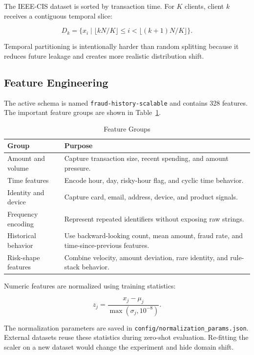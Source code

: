 \documentclass[conference]{IEEEtran}
\begin{document}
The IEEE-CIS dataset is sorted by transaction time. For \(K\) clients, client
\(k\) receives a contiguous temporal slice:

\begin{equation}
D_k=\{x_i \mid \lfloor kN/K \rfloor \leq i < \lfloor (k+1)N/K \rfloor\}.
\end{equation}

Temporal partitioning is intentionally harder than random splitting because it
reduces future leakage and creates more realistic distribution shift.

\subsection{Feature Engineering}

The active schema is named \texttt{fraud-history-scalable} and contains 328
features. The important feature groups are shown in Table~\ref{tab:features}.

\begin{table}[t]
\caption{Feature Groups}
\label{tab:features}
\centering
\begin{tabular}{p{}p{}}
\toprule
\textbf{Group} & \textbf{Purpose} \\
\midrule
Amount and volume & Capture transaction size, recent spending, and amount pressure. \\
Time features & Encode hour, day, risky-hour flag, and cyclic time behavior. \\
Identity and device & Capture card, email, address, device, and product signals. \\
Frequency encoding & Represent repeated identifiers without exposing raw strings. \\
Historical behavior & Use backward-looking count, mean amount, fraud rate, and time-since-previous features. \\
Risk-shape features & Combine velocity, amount deviation, rare identity, and rule-stack behavior. \\
\bottomrule
\end{tabular}
\end{table}

Numeric features are normalized using training statistics:

\begin{equation}
z_j=\frac{x_j-\mu_j}{\max(\sigma_j,10^{-8})}.
\end{equation}

The normalization parameters are saved in
\texttt{config/normalization\_params.json}. External datasets reuse these
statistics during zero-shot evaluation. Re-fitting the scaler on a new dataset
would change the experiment and hide domain shift.
\end{document}
